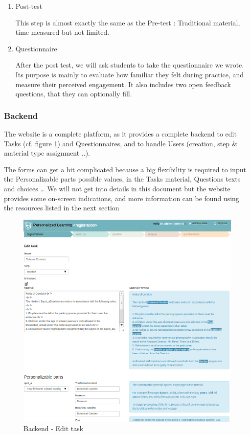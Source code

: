 \documentclass[a4paper,12pt]{article}
\makeatletter
\def\maxwidth{%
  \ifdim\Gin@nat@width>\linewidth
    \linewidth
  \else
    \Gin@nat@width
  \fi
}
\makeatother
\begin{document}
\begin{enumerate}
\item Post-test

This step is almost exactly the same as the Pre-test : Traditional material, time measured but not limited.

\item Questionnaire

After the post test, we will ask students to take the questionnaire we wrote. Its purpose is mainly to evaluate how familiar they felt during practice, and measure their perceived engagement.
It also includes two open feedback questions, that they can optionally fill.

\end{enumerate}


\subsubsection{Backend}

The website is a complete platform, as it provides a complete backend to edit Tasks (cf. figure \ref{edit_task}) and Questionnaires, and to handle Users (creation, step \& material type assignment ..).

The forms can get a bit complicated because a big flexibility is required to input the Personalizable parts possible values, in the Tasks material, Questions texts and choices … We will not get into details in this document but the website provides some on-screen indications, and more information can be found using the resources listed in the next section


\begin{figure}
\begin{center}
\includegraphics[width=\maxwidth]{edit_task.png}
\caption{Backend - Edit task}
\label{edit_task}
\end{center}
\end{figure}
\end{document}
